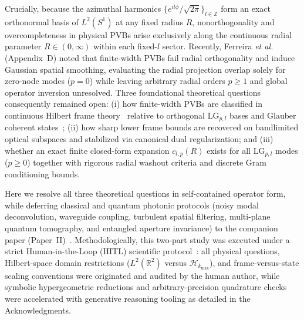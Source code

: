 \documentclass[aps,pra,reprint,nofootinbib,floatfix,longbibliography]{revtex4-2}
\theoremstyle{remark}
\begin{document}
Crucially, because the azimuthal harmonics $\{e^{il\phi}/\sqrt{2\pi}\}_{l\in\mathbb{Z}}$ form an exact orthonormal basis of $L^2(S^1)$ at any fixed radius $R$, nonorthogonality and overcompleteness in physical PVBs arise exclusively along the continuous radial parameter $R \in (0,\infty)$ within each fixed-$l$ sector. Recently, Ferreira \emph{et al.}~\cite{Ferreira2026} (Appendix~D) noted that finite-width PVBs fail radial orthogonality and induce Gaussian spatial smoothing, evaluating the radial projection overlap solely for zero-node modes ($p = 0$) while leaving arbitrary radial orders $p \ge 1$ and global operator inversion unresolved. Three foundational theoretical questions consequently remained open: (i) how finite-width PVBs are classified in continuous Hilbert frame theory~\cite{Duffin1952,Daubechies1990,Ali1993,Christensen2016} relative to orthogonal $\mathrm{LG}_{p,l}$ bases and Glauber coherent states~\cite{Klauder1985,Perelomov1986,Gazeau2009}; (ii) how sharp lower frame bounds are recovered on bandlimited optical subspaces and stabilized via canonical dual regularization; and (iii) whether an exact finite closed-form expansion $c_{l,p}(R)$ exists for all $\mathrm{LG}_{p,l}$ modes ($p \ge 0$) together with rigorous radial washout criteria and discrete Gram conditioning bounds.

Here we resolve all three theoretical questions in self-contained operator form, while deferring classical and quantum photonic protocols (noisy modal deconvolution, waveguide coupling, turbulent spatial filtering, multi-plane quantum tomography, and entangled aperture invariance) to the companion paper (Paper~II)~\cite{AyalaPaperII}. Methodologically, this two-part study was executed under a strict Human-in-the-Loop (HITL) scientific protocol~\cite{Krenn2022,Birhane2023,Messeri2024,Chandra2026TheoPhysEval,Thorp2023Science,COPE2023AI}: all physical questions, Hilbert-space domain restrictions ($L^2(\mathbb{R}^2)$ versus $\mathcal{H}_{k_{\max}}$), and frame-versus-state scaling conventions were originated and audited by the human author, while symbolic hypergeometric reductions and arbitrary-precision quadrature checks were accelerated with generative reasoning tooling as detailed in the Acknowledgments.
\end{document}
